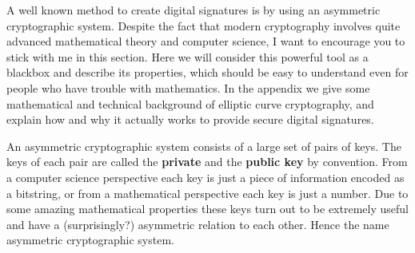 \documentclass[a4paper,12pt,oneside,openany]{book}
\begin{document}
A well known method to create digital signatures is by using an \gls{asymmetric cryptographic system}.
Despite the fact that modern cryptography involves quite advanced mathematical theory and computer science, I want to encourage you to stick with me in this section.
Here we will consider this powerful tool as a blackbox and describe its properties, which should be easy to understand even for people who have trouble with mathematics.
In the appendix we give some mathematical and technical background of elliptic curve cryptography, and explain how and why it actually works to provide secure digital signatures.

An asymmetric cryptographic system consists of a large set of pairs of keys.
The keys of each pair are called the \textbf{private} and the \textbf{public key} by convention.
From a computer science perspective each key is just a piece of information encoded as a bitstring, or from a mathematical perspective each key is just a number.
Due to some amazing mathematical properties these keys turn out to be extremely useful and have a (surprisingly?) asymmetric relation to each other.
Hence the name asymmetric cryptographic system.
\end{document}
